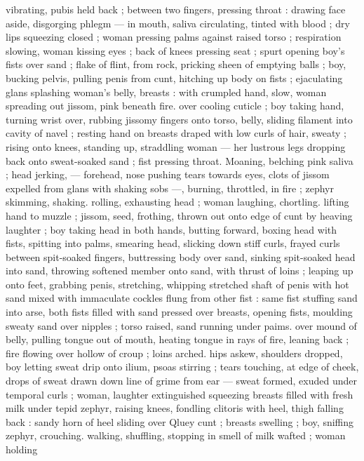 vibrating, pubis held back ; between two fingers, pressing throat : 
drawing face aside, disgorging phlegm --- in mouth, saliva 
circulating, tinted with blood ; dry lips squeezing closed ; woman 
pressing palms against raised torso ; respiration slowing, woman 
kissing eyes ; back of knees pressing seat ; spurt opening boy's fists 
over sand ; flake of flint, from rock, pricking sheen of emptying balls 
; boy, bucking pelvis, pulling penis from cunt, hitching up body on 
fists ; ejaculating glans splashing woman's belly, breasts : with 
crumpled hand, slow, woman spreading out jissom, pink beneath fire. 
over cooling cuticle ; boy taking hand, turning wrist over, rubbing 
jissomy fingers onto torso, belly, sliding filament into cavity of navel 
; resting hand on breasts draped with low curls of hair, sweaty ; rising 
onto knees, standing up, straddling woman --- her lustrous legs 
dropping back onto sweat-soaked sand ; fist pressing throat. 
Moaning, belching pink saliva ; head jerking, --- forehead, nose 
pushing tears towards eyes, clots of jissom expelled from glans with 
shaking sobs ---, burning, throttled, in fire ; zephyr skimming, 
shaking. rolling, exhausting head ; woman laughing, chortling. lifting 
hand to muzzle ; jissom, seed, frothing, thrown out onto edge of cunt 
by heaving laughter ; boy taking head in both hands, butting forward, 
boxing head with fists, spitting into palms, smearing head, slicking 
down stiff curls, frayed curls between spit-soaked fingers, 
buttressing body over sand, sinking spit-soaked head into sand, 
throwing softened member onto sand, with thrust of loins ; leaping 
up onto feet, grabbing penis, stretching, whipping stretched shaft of 
penis with hot sand mixed with immaculate cockles flung from other 
fist : same fist stuffing sand into arse, both fists filled with sand 
pressed over breasts, opening fists, moulding sweaty sand over 
nipples ; torso raised, sand running under paims. over mound of 
belly, pulling tongue out of mouth, heating tongue in rays of fire, 
leaning back ; fire flowing over hollow of croup ; loins arched. hips 
askew, shoulders dropped, boy letting sweat drip onto ilium, psoas 
stirring ; tears touching, at edge of cheek, drops of sweat drawn 
down line of grime from ear --- sweat formed, exuded under 
temporal curls ; woman, laughter extinguished squeezing breasts 
filled with fresh milk under tepid zephyr, raising knees, fondling 
clitoris with heel, thigh falling back : sandy horn of heel sliding over 
Qluey cunt ; breasts swelling ; boy, sniffing zephyr, crouching. 
walking, shuffling, stopping in smell of milk wafted ; woman holding 
